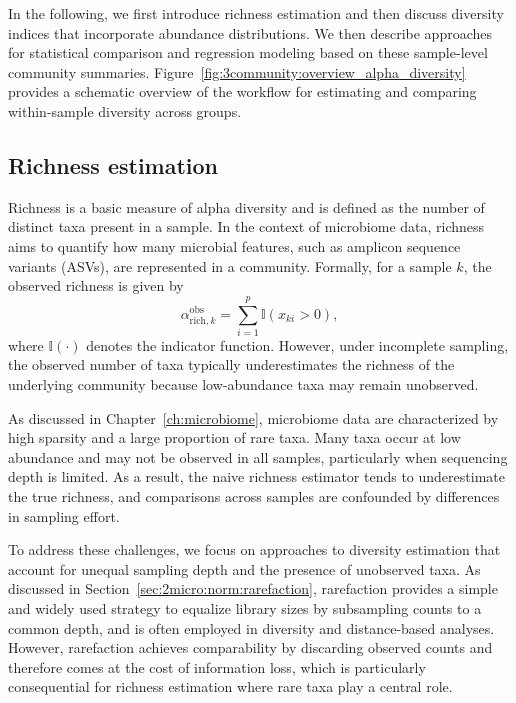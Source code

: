 In the following, we first introduce richness estimation and then discuss diversity indices that incorporate abundance distributions. We then describe approaches for statistical comparison and regression modeling based on these sample-level community summaries. Figure~\ref{fig:3community:overview_alpha_diversity} provides a schematic overview of the workflow for estimating and comparing within-sample diversity across groups.


\subsection{Richness estimation}
\label{sec:3community:within:richness}

Richness is a basic measure of alpha diversity and is defined as the number of distinct taxa present in a sample. In the context of microbiome data, richness aims to quantify how many microbial features, such as amplicon sequence variants (ASVs), are represented in a community. Formally, for a sample $k$, the observed richness is given by
\begin{equation}
\alpha_{\mathrm{rich}, k}^{\mathrm{obs}} = \sum_{i=1}^p \mathbb{I}(x_{ki} > 0),
\end{equation}
where $\mathbb{I}(\cdot)$ denotes the indicator function. However, under incomplete sampling, the observed number of taxa typically underestimates the richness of the underlying community because low-abundance taxa may remain unobserved.

As discussed in Chapter~\ref{ch:microbiome}, microbiome data are characterized by high sparsity and a large proportion of rare taxa. Many taxa occur at low abundance and may not be observed in all samples, particularly when sequencing depth is limited. As a result, the naive richness estimator tends to underestimate the true richness, and comparisons across samples are confounded by differences in sampling effort.

To address these challenges, we focus on approaches to diversity estimation that account for unequal sampling depth and the presence of unobserved taxa. As discussed in Section~\ref{sec:2micro:norm:rarefaction}, rarefaction provides a simple and widely used strategy to equalize library sizes by subsampling counts to a common depth, and is often employed in diversity and distance-based analyses. However, rarefaction achieves comparability by discarding observed counts and therefore comes at the cost of information loss, which is particularly consequential for richness estimation where rare taxa play a central role.

